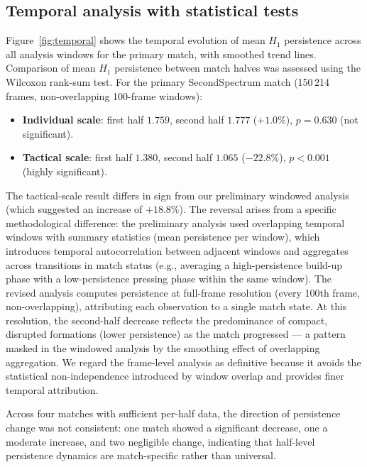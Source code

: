 \documentclass[11pt,a4paper]{article}
\begin{document}
\subsection{Temporal analysis with statistical tests}
\label{sec:temporal_stats}

Figure~\ref{fig:temporal} shows the temporal evolution of mean
\(H_1\) persistence across all analysis windows for the primary
match, with smoothed trend lines.  Comparison of mean \(H_1\)
persistence between match halves was assessed using the Wilcoxon
rank-sum test.  For the primary SecondSpectrum match
(150\,214 frames, non-overlapping 100-frame windows):

\begin{itemize}
  \item \textbf{Individual scale}: first half \(1.759\),
        second half \(1.777\) (\(+1.0\%\)),
        \(p = 0.630\) (not significant).
  \item \textbf{Tactical scale}: first half \(1.380\),
        second half \(1.065\) (\(-22.8\%\)),
        \(p < 0.001\) (highly significant).
\end{itemize}

\noindent
The tactical-scale result differs in sign from our preliminary
windowed analysis (which suggested an increase of
\(+18.8\%\)).  The reversal arises from a specific
methodological difference: the preliminary analysis used
overlapping temporal windows with summary statistics (mean
persistence per window), which introduces temporal
autocorrelation between adjacent windows and aggregates
across transitions in match status (e.g., averaging a
high-persistence build-up phase with a low-persistence
pressing phase within the same window).  The revised
analysis computes persistence at full-frame resolution (every
100th frame, non-overlapping), attributing each observation
to a single match state.  At this resolution, the second-half
decrease reflects the predominance of compact, disrupted
formations (lower persistence) as the match progressed --- a
pattern masked in the windowed analysis by the smoothing
effect of overlapping aggregation.  We regard the frame-level
analysis as definitive because it avoids the statistical
non-independence introduced by window overlap and provides
finer temporal attribution.

Across four matches with sufficient per-half data, the
direction of persistence change was not consistent: one
match showed a significant decrease, one a moderate increase,
and two negligible change, indicating that half-level
persistence dynamics are match-specific rather than universal.
\end{document}
